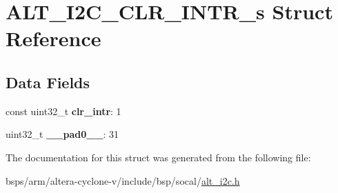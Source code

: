 \hypertarget{structALT__I2C__CLR__INTR__s}{}\section{A\+L\+T\+\_\+\+I2\+C\+\_\+\+C\+L\+R\+\_\+\+I\+N\+T\+R\+\_\+s Struct Reference}
\label{structALT__I2C__CLR__INTR__s}
\subsection*{Data Fields}
\begin{DoxyCompactItemize}
\item 
\mbox{\label{structALT__I2C__CLR__INTR__s_ac6cf5e47c184914ee6395d1a0f37c1b6}} 
const uint32\+\_\+t {\bfseries clr\+\_\+intr}\+: 1
\item 
\mbox{\label{structALT__I2C__CLR__INTR__s_af44114ce9ac6f018427cbf922c2e0637}} 
uint32\+\_\+t {\bfseries \+\_\+\+\_\+pad0\+\_\+\+\_\+}\+: 31
\end{DoxyCompactItemize}


The documentation for this struct was generated from the following file\+:\begin{DoxyCompactItemize}
\item 
bsps/arm/altera-\/cyclone-\/v/include/bsp/socal/\mbox{\hyperlink{socal_2alt__i2c_8h}{alt\+\_\+i2c.\+h}}\end{DoxyCompactItemize}
